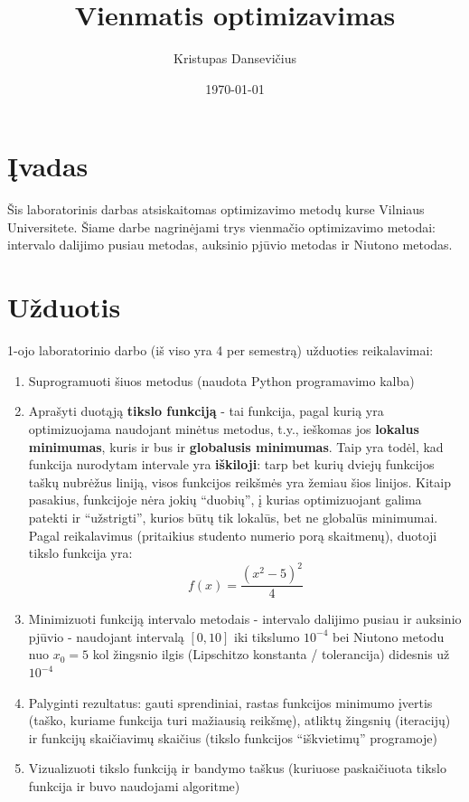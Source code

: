 \documentclass[lithuanian,a4paper,12pt]{article}
\title{Vienmatis optimizavimas}
\author{Kristupas Dansevičius}
\date{\today}
\begin{document}
\maketitle
\tableofcontents

\section{Įvadas}
Šis laboratorinis darbas atsiskaitomas optimizavimo metodų kurse Vilniaus Universitete. 
Šiame darbe nagrinėjami trys vienmačio optimizavimo metodai:
intervalo dalijimo pusiau metodas, auksinio pjūvio metodas ir Niutono metodas. 

\section{Užduotis}
1-ojo laboratorinio darbo (iš viso yra 4 per semestrą) užduoties reikalavimai:
\begin{enumerate}
    \item Suprogramuoti šiuos metodus (naudota Python programavimo kalba)
    \item Aprašyti duotąją \textbf{tikslo funkciją} - tai funkcija, pagal kurią yra optimizuojama naudojant minėtus metodus, t.y., ieškomas jos \textbf{lokalus minimumas}, kuris ir bus ir \textbf{globalusis minimumas}. Taip yra todėl, kad funkcija nurodytam intervale yra \textbf{iškiloji}: tarp bet kurių dviejų funkcijos taškų nubrėžus liniją, visos funkcijos reikšmės yra žemiau šios linijos. Kitaip pasakius, funkcijoje nėra jokių ``duobių'', į kurias optimizuojant galima patekti ir ``užstrigti'', kurios būtų tik lokalūs, bet ne globalūs minimumai. Pagal reikalavimus (pritaikius studento numerio porą skaitmenų), duotoji tikslo funkcija yra:
        \begin{equation}
            f(x) = \frac{(x^2 - 5)^2}{4}
        \end{equation}
    \item Minimizuoti funkciją intervalo metodais - intervalo dalijimo pusiau ir auksinio pjūvio - naudojant intervalą $[0,10]$ iki tikslumo $10^{-4}$ bei Niutono metodu nuo $x_0 = 5$ kol žingsnio ilgis (Lipschitzo konstanta / tolerancija) didesnis už $10^{-4}$
    \item Palyginti rezultatus: gauti sprendiniai, rastas funkcijos minimumo įvertis (taško, kuriame funkcija turi mažiausią reikšmę), atliktų žingsnių (iteracijų) ir funkcijų skaičiavimų skaičius (tikslo funkcijos ``iškvietimų'' programoje)
    \item Vizualizuoti tikslo funkciją ir bandymo taškus (kuriuose paskaičiuota tikslo funkcija ir buvo naudojami algoritme)
\end{enumerate}
\end{document}
